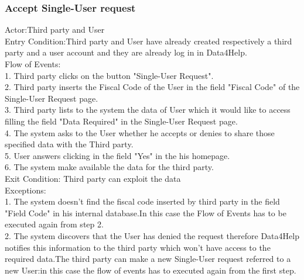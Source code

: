 \subsubsection{Accept Single-User request}
Actor:Third party and User\\
Entry Condition:Third party and User have already created respectively a third party and a user account and they are already log in in Data4Help.\\
Flow of Events:\\
1. Third party clicks on the button "Single-User Request".\\
2. Third party inserts the Fiscal Code of the User in the field "Fiscal Code" of the Single-User Request page.\\
3. Third party lists to the system the data of User which it would like to access filling the field "Data Required" in the Single-User Request page.\\
4. The system asks to the User whether he accepts or denies to share those specified data with the Third party.\\
5. User answers clicking in the field "Yes" in the his homepage.\\
6. The system make available the data for the third party.\\
Exit Condition: Third party can exploit the data \\
Exceptions:\\
1. The system doesn't find the fiscal code inserted by third party in the field "Field Code" in his internal database.In this case the Flow of Events has to be executed again from step 2. \\
2. The system discovers that the User has denied the request therefore Data4Help notifies this information to the third party which won't have access to the required data.The third party can make a new Single-User request referred to a new User:in this case the flow of events has to executed again from the first step.\\

